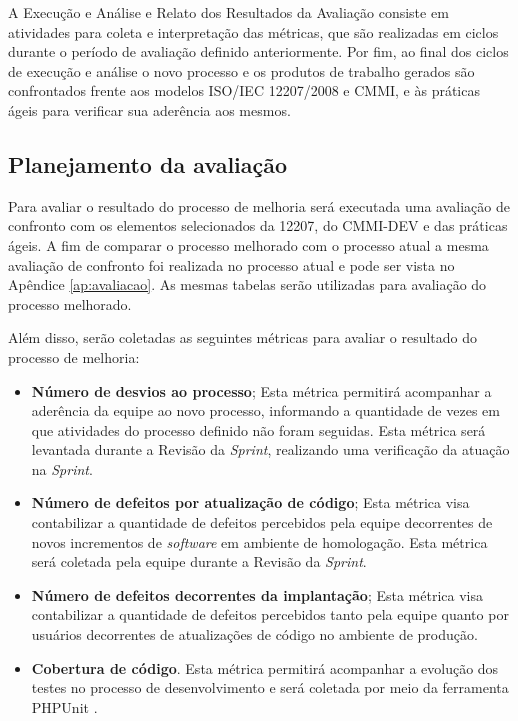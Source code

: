 A Execução e Análise e Relato dos Resultados da Avaliação consiste em atividades para coleta e interpretação das métricas,
que são realizadas em ciclos durante o período de avaliação definido anteriormente. Por fim, ao final dos ciclos de execução 
e análise o novo processo e os produtos de trabalho gerados são confrontados frente aos modelos ISO/IEC 12207/2008 e CMMI, e às práticas ágeis 
para verificar sua aderência aos mesmos.

\subsection{Planejamento da avaliação}
    
    Para avaliar o resultado do processo de melhoria será executada uma avaliação de confronto com os elementos selecionados
    da 12207, do CMMI-DEV e das práticas ágeis. A fim de comparar o processo melhorado com o processo atual a mesma avaliação 
    de confronto foi realizada no processo atual e pode ser vista no Apêndice \ref{ap:avaliacao}. As mesmas tabelas serão 
    utilizadas para avaliação do processo melhorado.
    
    Além disso, serão coletadas as seguintes métricas para avaliar o resultado do processo de melhoria:
    
    \begin{itemize}
      \item \textbf{Número de desvios ao processo};
	\subitem Esta métrica permitirá acompanhar a aderência da equipe ao novo processo, informando a quantidade
		 de vezes em que atividades do processo definido não foram seguidas. Esta métrica será levantada durante
		 a Revisão da \textit{Sprint}, realizando uma verificação da atuação na \textit{Sprint}.
      \item \textbf{Número de defeitos por atualização de código};
	\subitem Esta métrica visa contabilizar a quantidade de defeitos percebidos pela equipe decorrentes de novos
		 incrementos de \textit{software} em ambiente de homologação. Esta métrica será coletada pela equipe 
		 durante a Revisão da \textit{Sprint}.
      \item \textbf{Número de defeitos decorrentes da implantação};
	\subitem Esta métrica visa contabilizar a quantidade de defeitos percebidos tanto pela equipe quanto por usuários 
		 decorrentes de atualizações de código no ambiente de produção.
      \item \textbf{Cobertura de código}.
	\subitem Esta métrica permitirá acompanhar a evolução dos testes no processo de desenvolvimento e será coletada por meio da
		 ferramenta PHPUnit \footnotemark. 
    \end{itemize}
    
